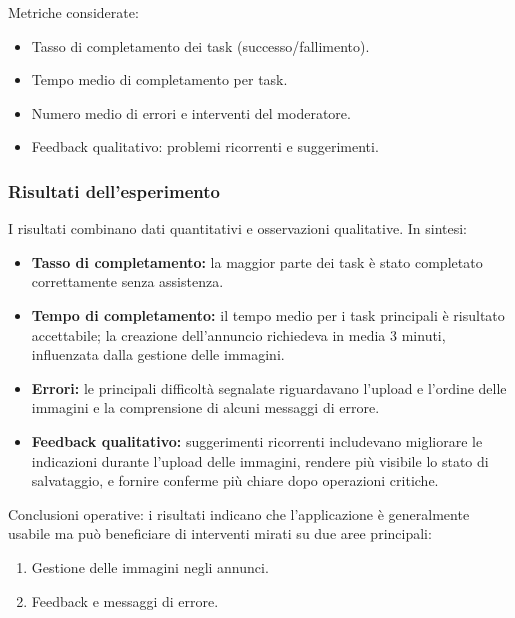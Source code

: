 Metriche considerate:
\begin{itemize}
    \item Tasso di completamento dei task (successo/fallimento).
    \item Tempo medio di completamento per task.
    \item Numero medio di errori e interventi del moderatore.
    \item Feedback qualitativo: problemi ricorrenti e suggerimenti.
\end{itemize}

\subsubsection{Risultati dell'esperimento}

I risultati combinano dati quantitativi e osservazioni qualitative. In sintesi:
\begin{itemize}
    \item \textbf{Tasso di completamento:} la maggior parte dei task è stato completato correttamente senza assistenza.
    
    \item \textbf{Tempo di completamento:} il tempo medio per i task principali è risultato accettabile; la creazione dell'annuncio richiedeva in media 3 minuti, influenzata dalla gestione delle immagini.
    
    \item \textbf{Errori:} le principali difficoltà segnalate riguardavano l'upload e l'ordine delle immagini e la comprensione di alcuni messaggi di errore.
    
    \item \textbf{Feedback qualitativo:} suggerimenti ricorrenti includevano migliorare le indicazioni durante l'upload delle immagini, rendere più visibile lo stato di salvataggio, e fornire conferme più chiare dopo operazioni critiche.
\end{itemize}

Conclusioni operative: i risultati indicano che l'applicazione è generalmente usabile ma può beneficiare di interventi mirati su due aree principali:
\begin{enumerate}
    \item Gestione delle immagini negli annunci.
    \item Feedback e messaggi di errore.
\end{enumerate}